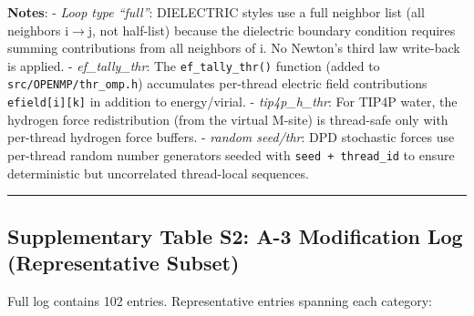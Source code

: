 \documentclass[
  11pt,
]{article}
\begin{document}
\textbf{Notes}: - \emph{Loop type ``full''}: DIELECTRIC styles use a
full neighbor list (all neighbors i\(\rightarrow\)j, not half-list)
because the dielectric boundary condition requires summing contributions
from all neighbors of i. No Newton's third law write-back is applied. -
\emph{ef\_tally\_thr}: The \texttt{ef\_tally\_thr()} function (added to
\texttt{src/OPENMP/thr\_omp.h}) accumulates per-thread electric field
contributions \texttt{efield{[}i{]}{[}k{]}} in addition to
energy/virial. - \emph{tip4p\_h\_thr}: For TIP4P water, the hydrogen
force redistribution (from the virtual M-site) is thread-safe only with
per-thread hydrogen force buffers. - \emph{random seed/thr}: DPD
stochastic forces use per-thread random number generators seeded with
\texttt{seed\ +\ thread\_id} to ensure deterministic but uncorrelated
thread-local sequences.

\begin{center}\rule{0.5\linewidth}{0.5pt}\end{center}

\subsection{Supplementary Table S2: A-3 Modification Log (Representative
Subset)}\label{supplementary-table-s2-a-3-modification-log-representative-subset}

Full log contains 102 entries. Representative entries spanning each
category:
\end{document}
